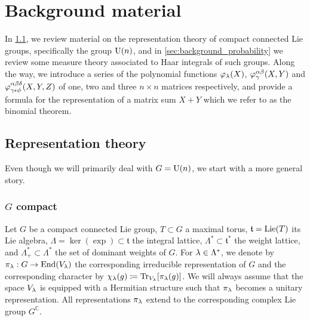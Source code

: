 \documentclass[notitlepage, 11pt, letterpaper]{amsart}
\begin{document}
\section{Background material}
\label{sec:background}

In \cref{sec:background_rep_theory}, we review material on the representation theory of compact connected Lie groups,
specifically the group $\operatorname{U}(n)$, and in \cref{sec:background_probability} we review some measure theory associated to Haar integrals of such groups.
Along the way, we introduce a series of the polynomial functions $\varphi_{\lambda}(X)$, $\varphi^{\alpha\beta}_{\gamma}(X,Y)$ and $\varphi^{\alpha\beta\delta}_{\gamma\epsilon\phi}(X,Y,Z)$ of one, two and three $n\times n$ matrices respectively,
and provide a formula for the representation of a matrix sum $X+Y$ which we refer to as the binomial theorem.

\subsection{Representation theory}
\label{sec:background_rep_theory}

Even though we will primarily deal with $G=\operatorname{U}(n)$, we start with a more general story.

\subsubsection{\texorpdfstring{$G$}{G} compact}
Let $G$ be a compact connected Lie group, $T \subset G$  a maximal torus, $\mathfrak{t} = \operatorname{Lie}(T)$ its Lie algebra, $\Lambda = \ker(\exp) \subset \mathfrak{t}$ the integral lattice, $\Lambda^* \subset \mathfrak{t}^*$ the weight lattice, and $\Lambda^*_+ \subset \Lambda^*$ the set of dominant weights of $G$.
For $\lambda \in \Lambda^*$, we denote by $\pi_\lambda: G \to \operatorname{End}(V_\lambda)$ the corresponding irreducible representation of $G$ and the corresponding character by $\chi_\lambda(g) \coloneqq \operatorname{Tr}_{V_\lambda}[\pi_\lambda(g)]$.
We will always assume that the space $V_\lambda$ is equipped with a Hermitian structure such that $\pi_\lambda$ becomes a unitary representation.
All representations $\pi_\lambda$ extend to the corresponding complex Lie group $G^\mathbb{C}$.
\end{document}
